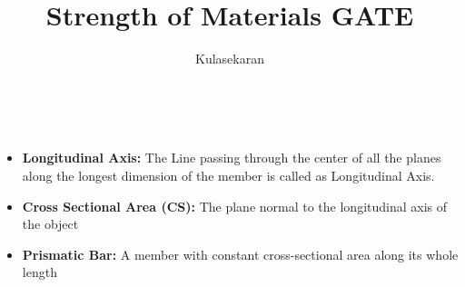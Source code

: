 \documentclass[8pt]{article}
\title{Strength of Materials GATE}\author{Kulasekaran}
\begin{document}
\maketitle
\begin{center}
	\section*{}
\end{center}
\\
	\begin{itemize}
		\item \textbf{Longitudinal Axis: }The Line passing through the center of all the planes along the longest dimension of the member is called as Longitudinal Axis. 
		\item \textbf{Cross Sectional Area (CS): }The plane normal to the longitudinal axis of the object
		\item \textbf{Prismatic Bar: }A member with constant cross-sectional area along its whole length
	\end{itemize}\hrulefill\\\\
\end{document}
